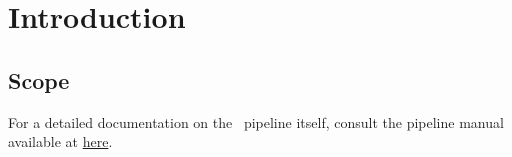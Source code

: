 \section{Introduction}

\subsection{Scope}


For a detailed documentation on the \instname\ pipeline itself,
consult the pipeline manual available at
\href{https://ftp.eso.org/pub/dfs/pipelines/instruments/iiinstrument/iiinstrument-pipeline-manual-0.6.pdf}{here}.
